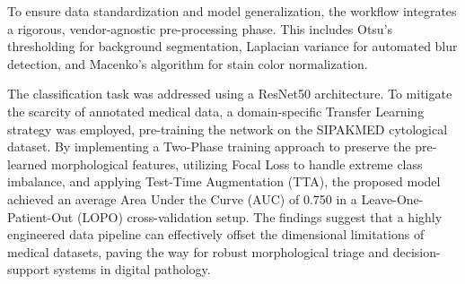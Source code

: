 To ensure data standardization and model generalization, the workflow integrates a rigorous, vendor-agnostic pre-processing phase. This includes Otsu's thresholding for background segmentation, Laplacian variance for automated blur detection, and Macenko's algorithm for stain color normalization.

The classification task was addressed using a ResNet50 architecture. To mitigate the scarcity of annotated medical data, a domain-specific Transfer Learning strategy was employed, pre-training the network on the SIPAKMED cytological dataset. By implementing a Two-Phase training approach to preserve the pre-learned morphological features, utilizing Focal Loss to handle extreme class imbalance, and applying Test-Time Augmentation (TTA), the proposed model achieved an average Area Under the Curve (AUC) of 0.750 in a Leave-One-Patient-Out (LOPO) cross-validation setup. The findings suggest that a highly engineered data pipeline can effectively offset the dimensional limitations of medical datasets, paving the way for robust morphological triage and decision-support systems in digital pathology.
